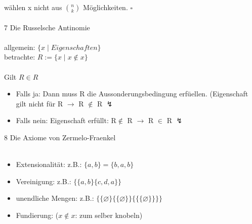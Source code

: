 \documentclass{scrartcl}\usepackage[utf8]{inputenc}
\begin{document}
w\"ahlen x nicht aus $\binom{n}{k}$ M\"oglichkeiten. \qquad $\square$\\
\\
\Large 7 Die Russelsche Antinomie\\
\\
\normalsize
allgemein: $\{x \mid Eigenschaften \}$\\
betrachte: $R := \{ x \mid x \notin x\}$\\
\\
Gilt $ R \in R$\\
   \begin{itemize}
    	\item Falls ja: Dann muss R die Aussonderungsbedingung erf\"uellen. (Eigenschaft gilt nicht f\"ur R $\to$ R $\notin$ R $\lightning$
	\item Falls nein: Eigenschaft erf\"ullt: R$\notin$ R $\to$ R $\in$ R $\lightning$\\
    \end{itemize}
\Large 8 Die Axiome von Zermelo-Fraenkel \\
\\
\normalsize
       \begin{itemize}
    	\item Extensionalit\"at: z.B.: $\{a,b\}=\{b, a, b\}$
	\item Vereinigung: z.B.: $\{ \{a, b\} \{c , d, a\} \}$
	\item unendliche Mengen: z.B.: $\{\{ \varnothing\}\{\{ \varnothing\}\}\{\{\{ \varnothing\}\}\}\}$
	\item Fundierung: ($x \notin x$: zum selber knobeln)
    \end{itemize}
\end{document}

